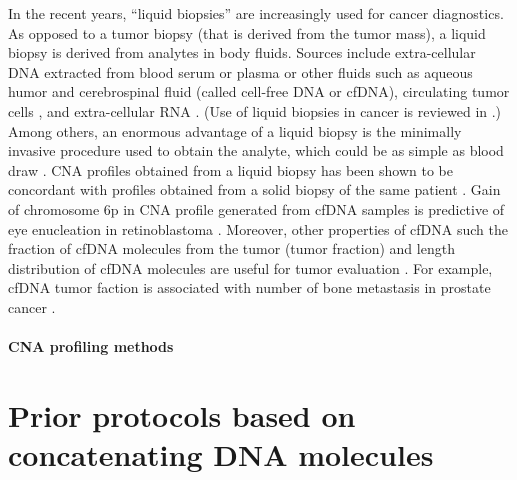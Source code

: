 In the recent years, ``liquid biopsies'' are increasingly used for cancer
diagnostics. As opposed to a tumor biopsy (that is derived from the
tumor mass), a liquid biopsy is derived from analytes in body fluids.
Sources include extra-cellular DNA extracted from blood serum or plasma
\citep{leary2012detection,chan2013cancer,li2017cell} or other
fluids such as aqueous humor \citep{berry2017potential}
and cerebrospinal fluid \citep{mouliere2018detection} (called cell-free
DNA or cfDNA), circulating tumor cells \citep{dago2014rapid}, and
extra-cellular RNA \citep{zaporozhchenko2018potential}.  (Use of liquid
biopsies in cancer is reviewed in
\citep{heitzer2019current,crowley2013liquid, schwarzenbach2011cell}.)
%
Among others, an enormous advantage of a liquid biopsy is the minimally
invasive procedure used to obtain the analyte, which could be as simple
as blood draw \citep{heitzer2019current}.
%
CNA profiles obtained from a liquid biopsy has been shown to be
concordant with profiles obtained from a solid biopsy of the same
patient \citep{chan2013cancer,berry2017potential}.
%
Gain of chromosome 6p in CNA profile generated from cfDNA samples is
predictive of eye enucleation in retinoblastoma
\citep{berry2018genomic}.
%
Moreover, other properties of cfDNA such the fraction of cfDNA molecules
from the tumor (tumor fraction) and length distribution of cfDNA
molecules are useful for tumor evaluation \citep{choudhury2018tumor,
mouliere2018enhanced,underhill2016fragment,cristiano2019genome}.  For
example, cfDNA tumor faction is associated with number of bone
metastasis in prostate cancer \citep{choudhury2018tumor}.



\paragraph{CNA profiling methods}





\section{Prior protocols based on concatenating DNA molecules}
